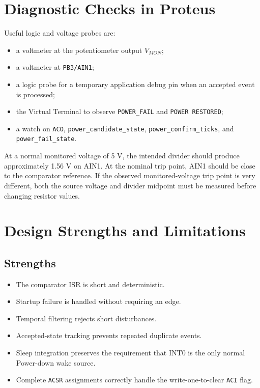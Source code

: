 \documentclass[11pt,a4paper]{article}
\begin{document}
\section{Diagnostic Checks in Proteus}
Useful logic and voltage probes are:
\begin{itemize}
  \item a voltmeter at the potentiometer output $V_{MON}$;
  \item a voltmeter at \texttt{PB3/AIN1};
  \item a logic probe for a temporary application debug pin when an accepted event is processed;
  \item the Virtual Terminal to observe \texttt{POWER\_FAIL} and \texttt{POWER RESTORED};
  \item a watch on \texttt{ACO}, \texttt{power\_candidate\_state}, \texttt{power\_confirm\_ticks}, and \texttt{power\_fail\_state}.
\end{itemize}

At a normal monitored voltage of 5 V, the intended divider should produce approximately 1.56 V on AIN1. At the nominal trip point, AIN1 should be close to the comparator reference. If the observed monitored-voltage trip point is very different, both the source voltage and divider midpoint must be measured before changing resistor values.

\section{Design Strengths and Limitations}
\subsection{Strengths}
\begin{itemize}
  \item The comparator ISR is short and deterministic.
  \item Startup failure is handled without requiring an edge.
  \item Temporal filtering rejects short disturbances.
  \item Accepted-state tracking prevents repeated duplicate events.
  \item Sleep integration preserves the requirement that INT0 is the only normal Power-down wake source.
  \item Complete \texttt{ACSR} assignments correctly handle the write-one-to-clear \texttt{ACI} flag.
\end{itemize}
\end{document}
